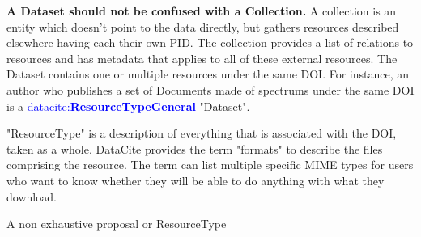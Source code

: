 \documentclass[11pt,a4paper]{ivoa}
\newcommand{\dataciteterm}[1]{\textcolor{blue}{\mbox{datacite:\textbf{#1}}}}
\begin{document}
\textbf{A Dataset should not be confused with a Collection.} A collection is an entity which doesn't point to the data directly, but gathers resources described elsewhere having each their own PID. The collection provides a list of relations to resources and has metadata that applies to all of these external resources. The Dataset contains one or multiple resources under the same DOI. For instance, an author who publishes a set of Documents made of spectrums under the same DOI is a \dataciteterm{ResourceTypeGeneral} "Dataset".

"ResourceType" is a description of everything that is associated with the DOI, taken as a whole. DataCite provides the term "formats" to describe the files comprising the resource. The term can list multiple specific MIME types for users who want to know whether they will be able to do anything with what they download.

A non exhaustive proposal or ResourceType
\end{document}
